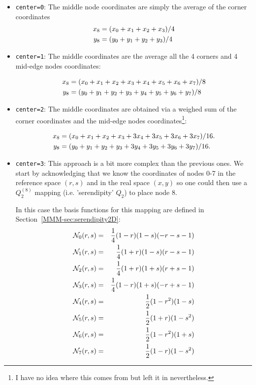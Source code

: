 \begin{itemize}
\item \lstinline{center=0}: The middle node coordinates are simply the 
average of the corner coordinates 
\begin{align}
x_8&=(x_0+x_1+x_2+x_3)/4 \nonumber\\
y_8&=(y_0+y_1+y_2+y_3)/4 \nonumber
\end{align}

\item \lstinline{center=1}: The middle coordinates are the average all the 
4 corners and 4 mid-edge nodes coordinates:

\begin{align}
x_8&=(x_0+x_1+x_2+x_3+x_4+x_5+x_6+x_7)/8 \nonumber\\
y_8&=(y_0+y_1+y_2+y_3+y_4+y_5+y_6+y_7)/8 \nonumber
\end{align}

\item \lstinline{center=2}: The middle coordinates are obtained via a 
weighed sum of the corner coordinates and the mid-edge nodes 
coordinates\footnote{I have no idea where this comes from but left it in nevertheless.}: 

\begin{align}
x_8&=(x_0+x_1+x_2+x_3+3x_4+3x_5+3x_6+3x_7)/16. \nonumber\\
y_8&=(y_0+y_1+y_2+y_3+3y_4+3y_5+3y_6+3y_7)/16. \nonumber
\end{align}

\item \lstinline{center=3}: This approach is a bit more complex than the previous ones.
We start by acknowledging that we know the coordinates of nodes 0-7 in the reference space $(r,s)$ 
and in the real space $(x,y)$ so one could then use a $Q_2^{(8)}$ mapping (i.e. 'serendipity' $Q_2$)
to place node 8.

In this case the basis functions for this mapping are defined in Section~\ref{MMM-sec:serendipity2D}:
\begin{eqnarray}
{\mathcal{N}}_0(r,s)&=& \frac{1}{4}(1-r)(1-s)(-r-s-1) \nonumber\\
{\mathcal{N}}_1(r,s)&=& \frac{1}{4}(1+r)(1-s)(r-s-1) \nonumber\\
{\mathcal{N}}_2(r,s)&=& \frac{1}{4}(1+r)(1+s)(r+s-1) \nonumber\\
{\mathcal{N}}_3(r,s)&=& \frac{1}{4}(1-r)(1+s)(-r+s-1) \nonumber\\
{\mathcal{N}}_4(r,s)&=& \frac{1}{2}(1-r^2)(1-s)  \nonumber\\
{\mathcal{N}}_5(r,s)&=& \frac{1}{2}(1+r)  (1-s^2)\nonumber\\
{\mathcal{N}}_6(r,s)&=& \frac{1}{2}(1-r^2)(1+s)  \nonumber\\
{\mathcal{N}}_7(r,s)&=& \frac{1}{2}(1-r)  (1-s^2) \nonumber
\end{eqnarray}


\end{itemize}
